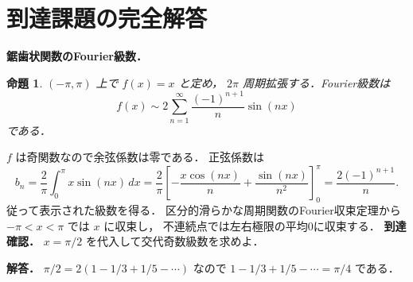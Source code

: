 \documentclass[a5paper,10pt,onecolumn]{jsarticle}
\makeatletter
\theoremstyle{mathnotetheorem}
\newtheorem{proposition}[theorem]{命題}
\renewcommand{\proofname}{証明}
\renewenvironment{proof}[1][\proofname]{%
  \par\pushQED{\qed}\normalfont\topsep4\p@\@plus2\p@\relax
  \trivlist\item[\hskip\labelsep\bfseries #1]\ignorespaces
}{\popQED\endtrivlist\@endpefalse}
\makeatother
\begin{document}
\section{到達課題の完全解答}
\noindent\textbf{鋸歯状関数のFourier級数．}
\begin{proposition}
$(-\pi,\pi)$ 上で $f(x)=x$ と定め，
$2\pi$ 周期拡張する．Fourier級数は
\[
f(x)\sim2\sum_{n=1}^\infty
\frac{(-1)^{n+1}}n\sin(nx)
\]
である．
\end{proposition}
\begin{proof}
$f$ は奇関数なので余弦係数は零である．
正弦係数は
\[
b_n=\frac2\pi\int_0^\pi x\sin(nx)\,dx
=\frac2\pi\left[
-\frac{x\cos(nx)}n+\frac{\sin(nx)}{n^2}
\right]_0^\pi
=\frac{2(-1)^{n+1}}n.
\]
従って表示された級数を得る．
区分的滑らかな周期関数のFourier収束定理から
$-\pi<x<\pi$ では $x$ に収束し，
不連続点では左右極限の平均0に収束する．
\end{proof}
\noindent\textbf{到達確認．}
$x=\pi/2$ を代入して交代奇数級数を求めよ．
\par\noindent\textbf{解答．}
$\pi/2=2(1-1/3+1/5-\cdots)$ なので
$1-1/3+1/5-\cdots=\pi/4$ である．
\end{document}
